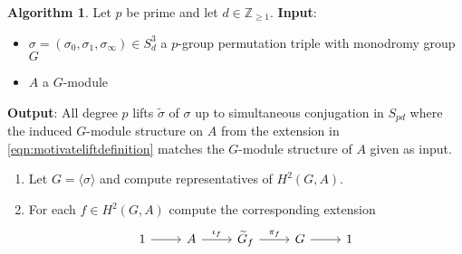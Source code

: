 \documentclass{dcthesis}
\newcommand{\ZZ}{\mathbb Z}
\newcommand{\wt}[1]{\widetilde{#1}}
\numberwithin{equation}{section}
\theoremstyle{definition}
\newtheorem{alg}[equation]{Algorithm}
\theoremstyle{remark}
\newtheorem{remark}[equation]{Remark}
\begin{document}
{{{      %
    \begin{alg}\label{alg:triples}
      Let $p$ be prime and
      let $d\in\ZZ_{\geq 1}$.
      \newline
      \textbf{Input}:
      \begin{itemize}
        \item 
          $\sigma=(\sigma_0,\sigma_1,\sigma_\infty)\in S_d^3$ a $p$-group permutation triple
          with monodromy group $G$
        \item
          $A$ a $G$-module
      \end{itemize}
      \textbf{Output}:
      \newline
      All degree $p$ lifts $\wt{\sigma}$
      of $\sigma$ up to
      simultaneous conjugation in $S_{pd}$
      where the induced $G$-module structure on
      $A$ from
      the extension in
      \eqref{eqn:motivateliftdefinition}
      matches the $G$-module structure of $A$
      given as input.
      \begin{enumerate}
        \item
          \label{alg:triplescomputeH2reps}
          Let $G = \langle\sigma\rangle$
          and compute representatives
          of $H^2(G,A)$.
        \item
          \label{alg:triplescomputeextensions}
          For each $f\in H^2(G,A)$
          compute the corresponding
          extension
          \begin{equation}
            \label{eqn:extensiondependson2cocycle}
            \begin{tikzcd}
              1\arrow{r}&A\arrow{r}{\iota_f}
                        &\wt{G}_f\arrow{r}{\pi_f}
                        &G\arrow{r}&1
            \end{tikzcd}

\end{equation}
\end{enumerate}
\end{alg}}}}
\end{document}
